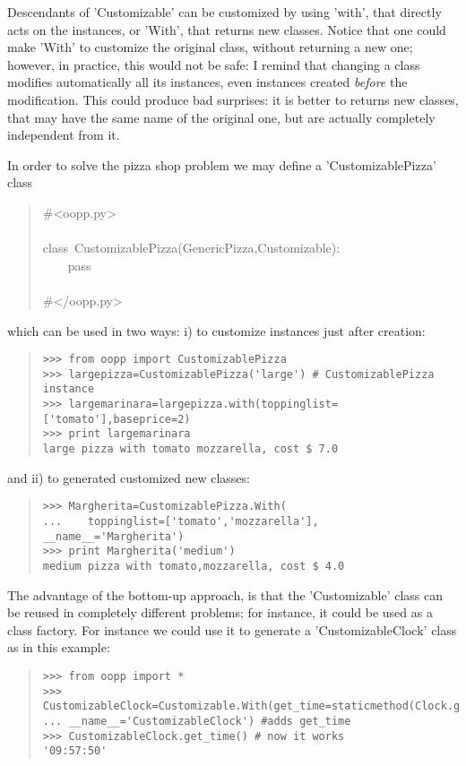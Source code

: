 \documentclass[10pt,english]{article}
\begin{document}
Descendants of 'Customizable' can be customized by using
'with', that directly acts on the instances, or 'With', that returns
new classes. Notice that one could make 'With' to customize the
original class, without returning a new one; however, in practice,
this would not be safe: I remind that changing a class modifies
automatically all its instances, even instances created \emph{before}
the modification. This could produce bad surprises: it is better to 
returns new classes, that may have the same name of the original one, 
but are actually completely independent from it.

In order to solve the pizza shop problem we may define a 'CustomizablePizza' 
class
\begin{quote}
\begin{ttfamily}\begin{flushleft}
\mbox{{\#}<oopp.py>}\\
\mbox{}\\
\mbox{class~CustomizablePizza(GenericPizza,Customizable):}\\
\mbox{~~~~pass}\\
\mbox{}\\
\mbox{{\#}</oopp.py>}
\end{flushleft}\end{ttfamily}
\end{quote}

which can be used in two ways: i) to customize instances just after creation:
\begin{quote}
\begin{verbatim}>>> from oopp import CustomizablePizza
>>> largepizza=CustomizablePizza('large') # CustomizablePizza instance
>>> largemarinara=largepizza.with(toppinglist=['tomato'],baseprice=2)
>>> print largemarinara
large pizza with tomato mozzarella, cost $ 7.0\end{verbatim}
\end{quote}

and ii) to generated customized new classes:
\begin{quote}
\begin{verbatim}>>> Margherita=CustomizablePizza.With(
...    toppinglist=['tomato','mozzarella'], __name__='Margherita')
>>> print Margherita('medium')
medium pizza with tomato,mozzarella, cost $ 4.0\end{verbatim}
\end{quote}

The advantage of the bottom-up approach, is that the 'Customizable' class
can be reused in completely different problems; for instance, it could
be used as a class factory. For instance we could use it to generate a 
'CustomizableClock' class as in this example:
\begin{quote}
\begin{verbatim}>>> from oopp import *
>>> CustomizableClock=Customizable.With(get_time=staticmethod(Clock.get_time),
... __name__='CustomizableClock') #adds get_time
>>> CustomizableClock.get_time() # now it works
'09:57:50'\end{verbatim}
\end{quote}
\end{document}

